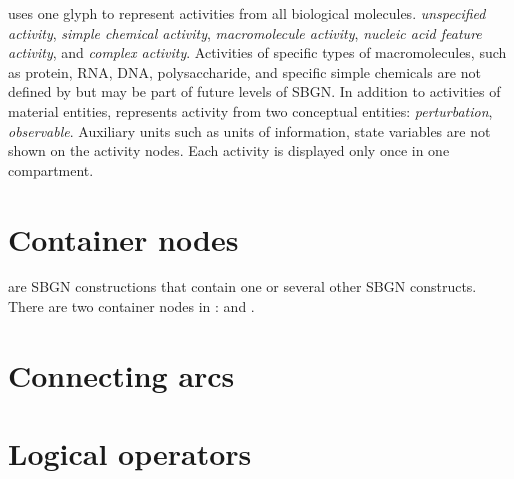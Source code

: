 \SBGNAFLone uses one glyph to represent activities from all biological molecules.
\emph{unspecified activity}, \emph{simple chemical activity}, \emph{macromolecule activity}, \emph{nucleic acid feature activity}, and \emph{complex activity}. Activities of specific types of macromolecules, such as protein, RNA, DNA, polysaccharide, and specific simple chemicals are not defined by \SBGNAFLone but may be part of future levels of SBGN. In addition to activities of material entities, \SBGNAFLone represents activity from two conceptual entities: \emph{perturbation}, \emph{observable}.  Auxiliary units such as units of information, state variables are not shown on the activity nodes.  Each activity is displayed only once in one compartment.











\section{Container nodes}
\label{sec:af:CNs}

 are SBGN constructions that contain one or several other SBGN constructs.  There are two container nodes in \SBGNAFLone:  and .





\section{Connecting arcs}\label{sec:af:arcs}







\section{Logical operators}\label{sec:af:logic}




